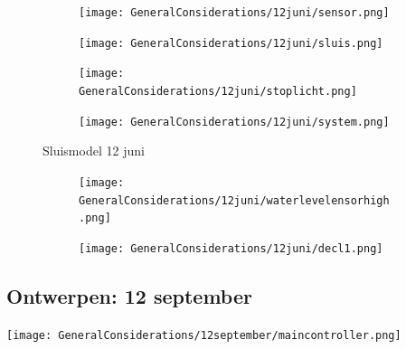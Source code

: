\documentclass{article}
\begin{document}
	\begin{figure}
		\centering
		\begin{subfigure}{0.45\linewidth}
			\texttt{[image: GeneralConsiderations/12juni/sensor.png]}
			\caption{}
			\label{fig:1a}
		\end{subfigure}\hfill
		\begin{subfigure}{0.45\linewidth}
			\texttt{[image: GeneralConsiderations/12juni/sluis.png]}
			\caption{}
			\label{fig:1a}
		\end{subfigure}
		
		\begin{subfigure}{0.45\linewidth}
			\texttt{[image: GeneralConsiderations/12juni/stoplicht.png]}
			\caption{}
			\label{fig:1a}
		\end{subfigure}\hfill
		\begin{subfigure}{0.45\linewidth}
			\texttt{[image: GeneralConsiderations/12juni/system.png]}
			\caption{}
			\label{fig:1a}
		\end{subfigure}
		\caption{Sluismodel 12 juni}
		\label{fig:1}
	\end{figure}
	
	\begin{figure}
		\centering
		\begin{subfigure}{0.45\linewidth}
			\texttt{[image: GeneralConsiderations/12juni/waterlevelensorhigh.png]}
			\caption{}
			\label{fig:1a}
		\end{subfigure}\hfill
		\begin{subfigure}{0.45\linewidth}
			\texttt{[image: GeneralConsiderations/12juni/decl1.png]}
			\caption{}
			\label{fig:1a}
		\end{subfigure}
	\end{figure}
	\newpage
	\subsection{Ontwerpen: 12 september}
	\texttt{[image: GeneralConsiderations/12september/maincontroller.png]}
	\newpage
\end{document}

